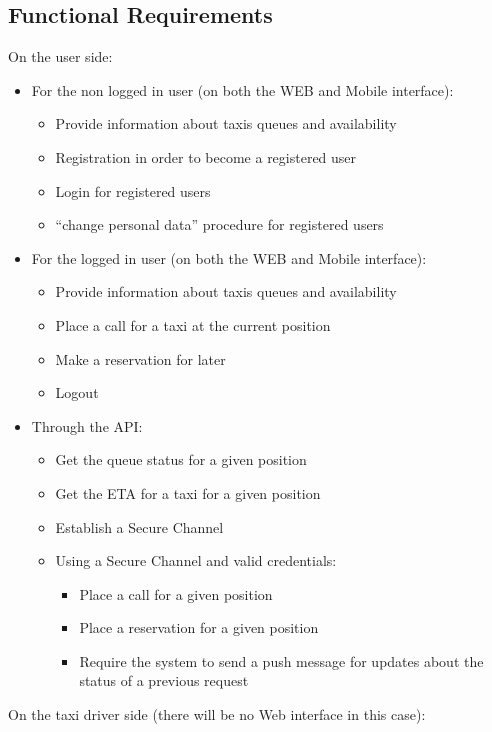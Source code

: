 \documentclass{article}
\begin{document}
\subsection{Functional Requirements}
On the user side:\@
\begin{itemize}
	\item For the non logged in user (on both the WEB and Mobile interface):
		\begin{itemize}
			\item Provide information about taxis queues and availability 
			\item Registration in order to become a registered user
			\item Login for registered users
			\item ``change personal data'' procedure for registered users
		\end{itemize}
	\item For the logged in user (on both the WEB and Mobile interface):
		\begin{itemize}
			\item Provide information about taxis queues and availability 
			\item Place a call for a taxi at the current position 
			\item Make a reservation for later
			\item Logout
		\end{itemize}
	\item Through the API:\@
		\begin{itemize}
			\item Get the queue status for a given position
			\item Get the ETA for a taxi for a given position
			\item Establish a Secure Channel 
			\item Using a Secure Channel and valid credentials:\@
				\begin{itemize}
					\item Place a call for a given position
					\item Place a reservation for a given position
					\item Require the system to send a push message for updates about the status of a previous request
				\end{itemize}
		\end{itemize}
\end{itemize}
On the taxi driver side (there will be no Web interface in this case):\@
\end{document}
